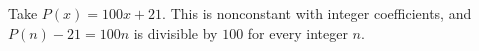 Take $\boxed{P(x)=100x+21}$. This is nonconstant with integer coefficients, and $P(n)-21=100n$ is divisible by $100$ for every integer $n$.
